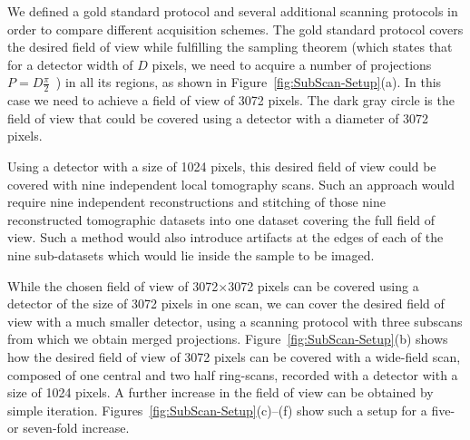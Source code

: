 \documentclass[preprint,s]{iucr}
\begin{document}
We defined a gold standard protocol and several additional scanning protocols in order to compare different acquisition schemes. The gold standard protocol covers the desired field of view while fulfilling the sampling theorem (which states that for a detector width of $D$ pixels, we need to acquire a number of projections $P=D\frac{\pi}{2}$~\cite{Kak2002}) in all its regions, as shown in Figure~\ref{fig:SubScan-Setup}(a). In this case we need to achieve a field of view of 3072 pixels. The dark gray circle is the field of view that could be covered using a detector with a diameter of 3072 pixels.

Using a detector with a size of 1024 pixels, this desired field of view could be covered with nine independent local tomography scans. Such an approach would require nine independent reconstructions and stitching of those nine reconstructed tomographic datasets into one dataset covering the full field of view. Such a method would also introduce artifacts at the edges of each of the nine sub-datasets which would lie inside the sample to be imaged.

While the chosen field of view of 3072$\times$3072 pixels can be covered using a detector of the size of 3072 pixels in one scan, we can cover the desired field of view with a much smaller detector, using a scanning protocol with three subscans from which we obtain merged projections. Figure~\ref{fig:SubScan-Setup}(b) shows how the desired field of view of 3072 pixels can be covered with a wide-field scan, composed of one central and two half ring-scans, recorded with a detector with a size of 1024 pixels. A further increase in the field of view can be obtained by simple iteration. Figures~\ref{fig:SubScan-Setup}(c)--(f) show such a setup for a five- or seven-fold increase.
\end{document}
